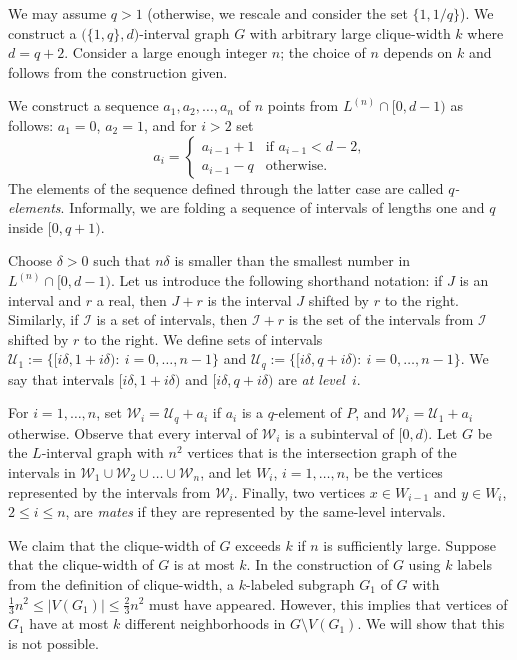 \documentclass{CSML}
\def\ca#1{{\mathcal#1}}
\newcommand{\II}{\mathcal{I}}
\theoremstyle{plain}\newtheorem{claim}[thm]{Claim}
\begin{document}
\proof
We may assume $q>1$ (otherwise, we rescale and consider the set $\{1,1/q\}$).
We construct a $\big(\{1,q\},d\big)$-interval graph $G$ with arbitrary large clique-width $k$ where $d=q+2$.
Consider a large enough integer $n$; the choice of $n$ depends on $k$ and follows from the construction given.

We construct a sequence $a_1,a_2,\dots,a_n$ of $n$ points from $L^{(n)}\cap [0,d-1)$ as follows:
$a_1=0$, $a_2=1$, and for $i>2$ set
$$a_{i}=\left\{\begin{array}{cl}
               a_{i-1}+1 & \mbox{if $a_{i-1}<d-2$,} \\
	       a_{i-1}-q & \mbox{otherwise.}
	       \end{array}\right.$$
The elements of the sequence defined through the latter case are called {\em $q$-elements}.
Informally, we are folding a sequence of intervals of lengths one and $q$ inside $[0,q+1)$.

Choose $\delta>0$ such that $n\delta$ is smaller than the smallest number in~$L^{(n)}\cap[0,d-1)$.
Let us introduce the following shorthand notation:
if $J$ is an interval and $r$ a real,
then $J+r$ is the interval $J$ shifted by $r$ to the right.
Similarly, if $\II$ is a set of intervals,
then $\II+r$ is the set of the intervals from $\II$ shifted by $r$ to the right.
We define sets of intervals
$\ca U_1:=\{[i\delta,1+i\delta):\> i=0,\dots,n-1\}$ and
$\ca U_q:=\{[i\delta,q+i\delta):\> i=0,\dots,n-1\}$.
We say that intervals $[i\delta,1+i\delta)$ and $[i\delta,q+i\delta)$ are {\em at level~$i$}.

For $i=1,\dots,n$, set $\ca W_i=\ca U_q+a_i$ if $a_i$ is a $q$-element of $P$, and $\ca W_i=\ca U_1+a_i$ otherwise.
Observe that every interval of $\ca W_i$ is a subinterval of $[0,d)$.
Let $G$ be the $L$-interval graph with $n^2$ vertices that
is the intersection graph of the intervals in $\ca W_1\cup\ca W_2\cup\dots\cup\ca W_n$, and
let $W_i$, $i=1,\ldots,n$, be the vertices represented by the intervals from $\ca W_i$.
Finally,
two vertices $x\in W_{i-1}$ and $y\in W_{i}$, $2\leq i\leq n$, are {\em mates}
if they are represented by the same-level intervals.

We claim that the clique-width of $G$ exceeds $k$ if $n$ is sufficiently large.
Suppose that the clique-width of $G$ is at most $k$.
In the construction of $G$ using $k$ labels from the definition of clique-width,
a $k$-labeled subgraph $G_1$ of $G$ with $\frac13n^2\leq |V(G_1)| \leq\frac23n^2$ must have appeared.
However, this implies that vertices of $G_1$ have at most $k$ different neighborhoods in $G\setminus V(G_1)$.
We will show that this is not possible.
\end{document}
